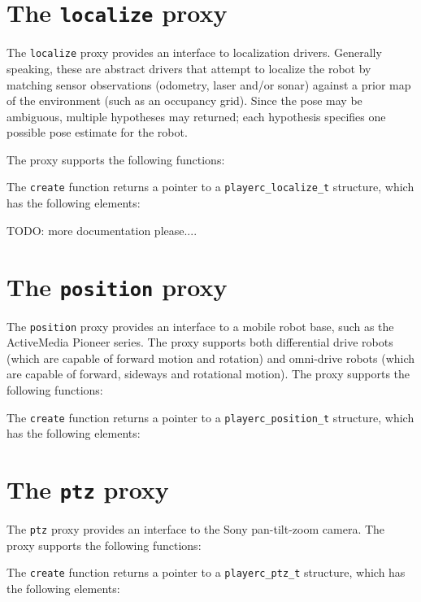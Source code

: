 \documentclass[11pt]{report}
\begin{document}
\newpage
\section{The {\tt localize} proxy}

The {\tt localize} proxy provides an interface to localization
drivers.  Generally speaking, these are abstract drivers that attempt
to localize the robot by matching sensor observations (odometry, laser
and/or sonar) against a prior map of the environment (such as an
occupancy grid).  Since the pose may be ambiguous, multiple hypotheses
may returned; each hypothesis specifies one possible pose estimate for
the robot.

The proxy supports the following functions:
\begin{quote}

\end{quote}
The {\tt create} function returns a pointer to a {\tt playerc\_localize\_t}
structure, which has the following elements:
\begin{quote}

\end{quote}

TODO: more documentation please....


\newpage
\section{The {\tt position} proxy}

The {\tt position} proxy provides an interface to a mobile robot base,
such as the ActiveMedia Pioneer series.  The proxy supports both
differential drive robots (which are capable of forward motion and
rotation) and omni-drive robots (which are capable of forward,
sideways and rotational motion).  The proxy supports the following
functions:
\begin{quote}

\end{quote}
The {\tt create} function returns a pointer to a {\tt playerc\_position\_t}
structure, which has the following elements:
\begin{quote}

\end{quote}


\newpage
\section{The {\tt ptz} proxy}

The {\tt ptz} proxy provides an interface to the Sony pan-tilt-zoom
camera.  The proxy supports the following
functions:
\begin{quote}

\end{quote}
The {\tt create} function returns a pointer to a {\tt playerc\_ptz\_t}
structure, which has the following elements:
\begin{quote}

\end{quote}
\end{document}
